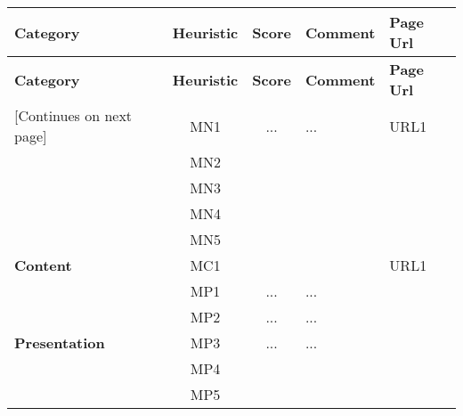 \begin{tabularx}{\linewidth}{l c c X p{3cm}}
\toprule
\textbf{Category} & \textbf{Heuristic} & \textbf{Score} & \textbf{Comment} & \textbf{Page Url} \\
\midrule
\endfirsthead
\toprule
\textbf{Category} & \textbf{Heuristic} & \textbf{Score} & \textbf{Comment} & \textbf{Page Url} \\
\midrule
\endhead
\midrule
\footnotesize [Continues on next page]
\endfoot
\bottomrule
\endlastfoot

\multirow{5}{*}{\textbf{Navigation}}   
    & MN1 & ... & ... & URL1 \\ \cmidrule{2-5} 
    & MN2 &  &  &\\ \cmidrule{2-5} 
    & MN3 &  &  &\\ \cmidrule{2-5} 
    & MN4 &  &  &\\ \cmidrule{2-5} 
    & MN5 &  &  &\\ \midrule
\textbf{Content}                       & MC1 &  &  & URL1  \\ \midrule
\multirow{5}{*}{\textbf{Presentation}} & MP1 & ... & ... \\ \cmidrule{2-5} 
    & MP2 & ... & ... & \\ \cmidrule{2-5} 
    & MP3 & ... & ... & \\ \cmidrule{2-5} 
    & MP4 &  &  &\\ \cmidrule{2-5} 
    & MP5 &  & &
\end{tabularx}

\pagebreak

